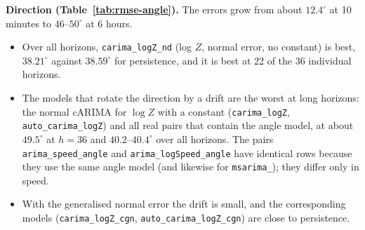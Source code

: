 \documentclass[11pt,a4paper]{article}
\newcommand{\code}[1]{\texttt{#1}}
\begin{document}
\textbf{Direction (Table~\ref{tab:rmse-angle}).} The errors grow from about $12.4^\circ$ at 10
minutes to $46$--$50^\circ$ at 6 hours.
\begin{itemize}
  \item Over all horizons, \code{carima\_logZ\_nd} (log $Z$, normal error, no constant) is best,
    $38.21^\circ$ against $38.59^\circ$ for persistence, and it is best at 22 of the 36 individual
    horizons.
  \item The models that rotate the direction by a drift are the worst at long horizons: the normal
    cARIMA for $\log Z$ with a constant (\code{carima\_logZ}, \code{auto\_carima\_logZ}) and all real
    pairs that contain the angle model, at about $49.5^\circ$ at $h = 36$ and $40.2$--$40.4^\circ$ over
    all horizons. The pairs \code{arima\_speed\_angle} and \code{arima\_logSpeed\_angle} have
    identical rows because they use the same angle model (and likewise for \code{msarima\_}); they
    differ only in speed.
  \item With the generalised normal error the drift is small, and the corresponding models
    (\code{carima\_logZ\_cgn}, \code{auto\_carima\_logZ\_cgn}) are close to persistence.
\end{itemize}
\end{document}
